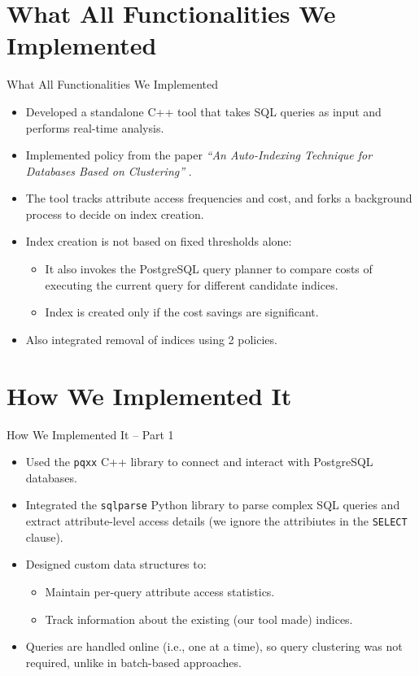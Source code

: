 \documentclass[Serif, 10pt, brown]{beamer}
\theoremstyle{example}
\theoremstyle{plain}
\begin{document}
\section{What All Functionalities We Implemented}
\begin{frame}{What All Functionalities We Implemented}
	\begin{itemize}
		\item Developed a standalone C++ tool that takes SQL queries as input and performs real-time analysis.
		\item Implemented policy from the paper \textit{``An Auto-Indexing Technique for Databases Based on Clustering''} \cite{1333569}.
		\item The tool tracks attribute access frequencies and cost, and forks a background process to decide on index creation.
		\item Index creation is not based on fixed thresholds alone:
		\begin{itemize}
			\item It also invokes the PostgreSQL query planner to compare costs of executing the current query for different candidate indices.
			\item Index is created only if the cost savings are significant.
		\end{itemize}
		\item Also integrated removal of indices using 2 policies.
	\end{itemize}
\end{frame}

\section{How We Implemented It}
\begin{frame}{How We Implemented It – Part 1}
	\begin{itemize}
		\item Used the \texttt{pqxx} C++ library to connect and interact with PostgreSQL databases.
		\item Integrated the \texttt{sqlparse} Python library to parse complex SQL queries and extract attribute-level access details (we ignore the attribiutes in the \texttt{SELECT} clause).
		\item Designed custom data structures to:
		\begin{itemize}
			\item Maintain per-query attribute access statistics.
			\item Track information about the existing (our tool made) indices.
		\end{itemize}
		\item Queries are handled online (i.e., one at a time), so query clustering was not required, unlike in batch-based approaches.
	\end{itemize}
\end{frame}
\end{document}

